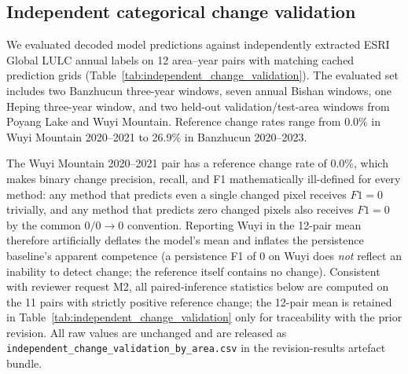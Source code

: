 \documentclass{article}
\begin{document}
\subsection{Independent categorical change validation}
\label{sec:independent_change_validation}

We evaluated decoded model predictions against independently extracted ESRI Global LULC annual labels on 12 area--year pairs with matching cached prediction grids (Table~\ref{tab:independent_change_validation}). The evaluated set includes two Banzhucun three-year windows, seven annual Bishan windows, one Heping three-year window, and two held-out validation/test-area windows from Poyang Lake and Wuyi Mountain. Reference change rates range from 0.0\% in Wuyi Mountain 2020--2021 to 26.9\% in Banzhucun 2020--2023.

The Wuyi Mountain 2020--2021 pair has a reference change rate of 0.0\%, which makes binary change precision, recall, and F1 mathematically ill-defined for every method: any method that predicts even a single changed pixel receives $F1=0$ trivially, and any method that predicts zero changed pixels also receives $F1=0$ by the common $0/0 \to 0$ convention. Reporting Wuyi in the 12-pair mean therefore artificially deflates the model's mean and inflates the persistence baseline's apparent competence (a persistence F1 of $0$ on Wuyi does \emph{not} reflect an inability to detect change; the reference itself contains no change). Consistent with reviewer request M2, all paired-inference statistics below are computed on the 11 pairs with strictly positive reference change; the 12-pair mean is retained in Table~\ref{tab:independent_change_validation} only for traceability with the prior revision. All raw values are unchanged and are released as \texttt{independent\_change\_validation\_by\_area.csv} in the revision-results artefact bundle.
\end{document}
